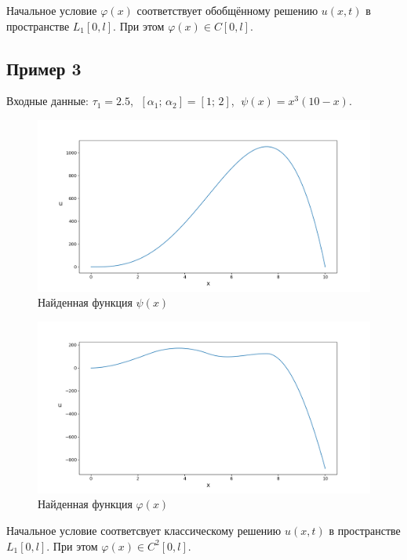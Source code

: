 \documentclass{article}
\theoremstyle{definition}
\begin{document}
Начальное условие $\varphi(x)$ соответствует обобщённому решению $u(x,t)$ в пространстве $L_1[0,l]$. При этом
$\varphi(x) \in C[0,l]$.

\newpage

\subsection{Пример 3}
Входные данные: 
$\tau_1 = 2.5$, $\;[\alpha_1;\, \alpha_2] = [1;\, 2]$, $\;\psi(x) = x^3(10 - x)$.
\begin{figure}[H]
	\centering
	\includegraphics[trim={2.02cm, 0, 0, 1.5cm}, clip, scale=0.61]{3_psi.png}
	\caption{Найденная функция $\psi(x)$}
	\label{fig:image7}
\end{figure}
\begin{figure}[H]
	\centering
	\includegraphics[trim={2.02cm, 0, 0, 1.5cm}, clip, scale=0.61]{3_u0.png}
	\caption{Найденная функция $\varphi(x)$}
	\label{fig:image8}
\end{figure}

Начальное условие соответсвует классическому решению $u(x,t)$ в пространстве $L_1[0,l]$. При этом
$\varphi(x) \in C^2[0,l]$.

\newpage
\end{document}
